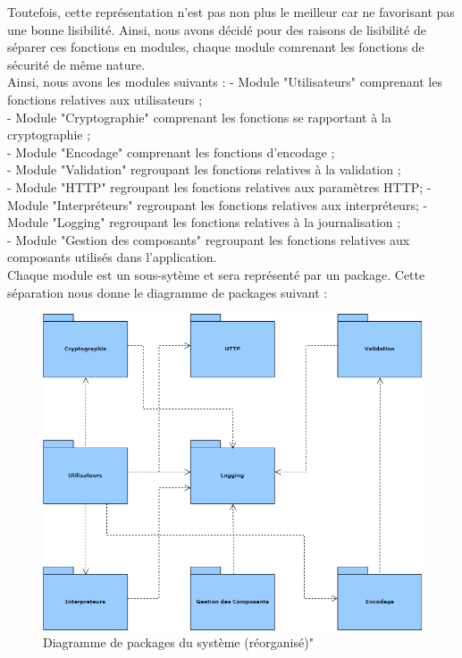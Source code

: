 Toutefois, cette représentation n'est pas non plus le meilleur car ne favorisant pas une bonne lisibilité. Ainsi, nous avons décidé pour des raisons de lisibilité de séparer ces fonctions en modules, chaque module comrenant les fonctions de sécurité de même nature.\\
Ainsi, nous avons les modules suivants :
- Module "Utilisateurs" comprenant les fonctions relatives aux utilisateurs ;\\
- Module "Cryptographie" comprenant les fonctions se rapportant à la cryptographie ; \\
- Module "Encodage" comprenant les fonctions d'encodage ; \\ 
- Module "Validation" regroupant les fonctions relatives à la validation ; \\
- Module "HTTP" regroupant les fonctions relatives aux paramètres HTTP;
- Module "Interpréteurs" regroupant les fonctions relatives aux interpréteurs;
- Module "Logging" regroupant les fonctions relatives à la journalisation ; \\
- Module "Gestion des composants" regroupant les fonctions relatives aux composants utilisés dans l'application.\\
Chaque module est un sous-sytème et sera représenté par un package. Cette séparation nous donne le diagramme de packages suivant :
\begin{figure}[H]
	\centering
	\includegraphics[height=0.5\textheight]{fig/S-Package-diagram.png}
	\caption{Diagramme de packages du système (réorganisé)"}
\end{figure}


